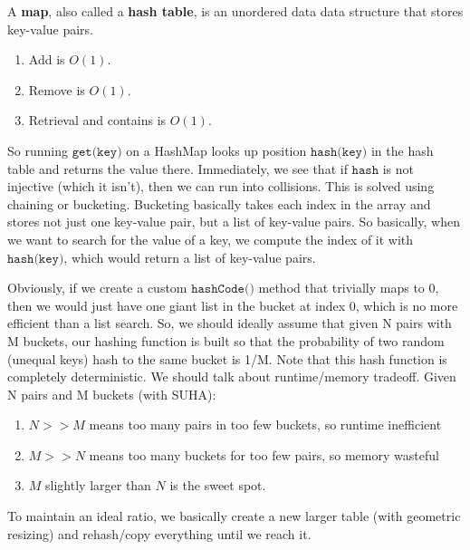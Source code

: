   \begin{definition}[Maps]
    A \textbf{map}, also called a \textbf{hash table}, is an unordered data data structure that stores key-value pairs.   
    \begin{enumerate}
      \item Add is $O(1)$. 
      \item Remove is $O(1)$. 
      \item Retrieval and contains is $O(1)$. 
    \end{enumerate}
  \end{definition}

  So running $\texttt{get(key)}$ on a HashMap looks up position $\texttt{hash(key)}$ in the hash table and returns the value there. Immediately, we see that if $\texttt{hash}$ is not injective (which it isn't), then we can run into collisions. This is solved using chaining or bucketing. Bucketing basically takes each index in the array and stores not just one key-value pair, but a list of key-value pairs. So basically, when we want to search for the value of a key, we compute the index of it with $\texttt{hash(key)}$, which would return a list of key-value pairs. 

  Obviously, if we create a custom $\texttt{hashCode()}$ method that trivially maps to 0, then we would just have one giant list in the bucket at index 0, which is no more efficient than a list search. So, we should ideally assume that given N pairs with M buckets, our hashing function is built so that the probability of two random (unequal keys) hash to the same bucket is 1/M. Note that this hash function is completely deterministic. We should talk about runtime/memory tradeoff. Given N pairs and M buckets (with SUHA): 
  \begin{enumerate}
      \item $N >> M$ means too many pairs in too few buckets, so runtime inefficient 
      \item $M >> N$ means too many buckets for too few pairs, so memory wasteful 
      \item $M$ slightly larger than $N$ is the sweet spot.
  \end{enumerate}
  To maintain an ideal ratio, we basically create a new larger table (with geometric resizing) and rehash/copy everything until we reach it.


